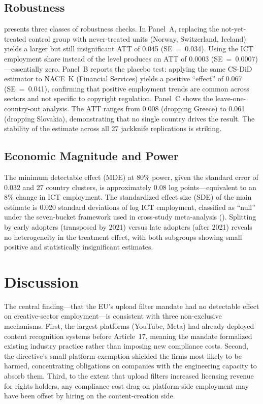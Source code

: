 \documentclass[12pt]{article}
\begin{document}


\subsection{Robustness}

 presents three classes of robustness checks. In Panel~A, replacing the not-yet-treated control group with never-treated units (Norway, Switzerland, Iceland) yields a larger but still insignificant ATT of 0.045 (SE~=~0.034). Using the ICT employment share instead of the level produces an ATT of 0.0003 (SE~=~0.0007)---essentially zero. Panel~B reports the placebo test: applying the same CS-DiD estimator to NACE~K (Financial Services) yields a positive ``effect'' of 0.067 (SE~=~0.041), confirming that positive employment trends are common across sectors and not specific to copyright regulation. Panel~C shows the leave-one-country-out analysis. The ATT ranges from 0.008 (dropping Greece) to 0.061 (dropping Slovakia), demonstrating that no single country drives the result. The stability of the estimate across all 27 jackknife replications is striking.



\subsection{Economic Magnitude and Power}

The minimum detectable effect (MDE) at 80\% power, given the standard error of 0.032 and 27 country clusters, is approximately 0.08 log points---equivalent to an 8\% change in ICT employment. The standardized effect size (SDE) of the main estimate is 0.020 standard deviations of log ICT employment, classified as ``null'' under the seven-bucket framework used in cross-study meta-analysis (). Splitting by early adopters (transposed by 2021) versus late adopters (after 2021) reveals no heterogeneity in the treatment effect, with both subgroups showing small positive and statistically insignificant estimates.


\section{Discussion}

The central finding---that the EU's upload filter mandate had no detectable effect on creative-sector employment---is consistent with three non-exclusive mechanisms. First, the largest platforms (YouTube, Meta) had already deployed content recognition systems before Article~17, meaning the mandate formalized existing industry practice rather than imposing new compliance costs. Second, the directive's small-platform exemption shielded the firms most likely to be harmed, concentrating obligations on companies with the engineering capacity to absorb them. Third, to the extent that upload filters increased licensing revenue for rights holders, any compliance-cost drag on platform-side employment may have been offset by hiring on the content-creation side.
\end{document}

